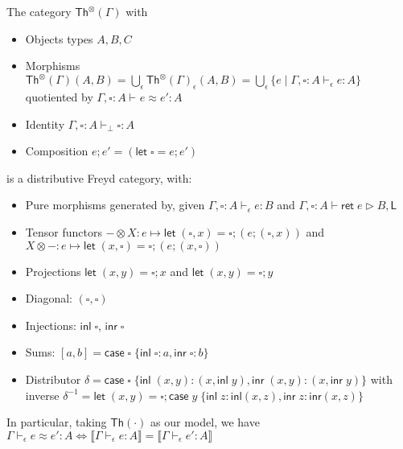 \documentclass[acmsmall,screen,review]{acmart}
\newcommand{\ms}[1]{\ensuremath{\mathsf{#1}}}
\newcommand{\lto}{:}
\newcommand{\linl}[1]{\ms{inl}\;{#1}}
\newcommand{\linr}[1]{\ms{inr}\;{#1}}
\newcommand{\caseexpr}[5]{\ms{case}\;#1\;\{\linl{#2} \lto #3, \linr{#4} \lto #5\}}
\newcommand{\bhyp}[2]{#1 : #2}
\newcommand{\hasty}[4]{#1 \vdash_{#2} #3: {#4}}
\newcommand{\haslb}[3]{#1 \vdash #2 \rhd #3}
\newcommand{\teqv}{\approx}
\newcommand{\tmeq}[5]{#1 \vdash_{#2} #3 \teqv #4 : {#5}}
\newcommand{\dnt}[1]{\llbracket{#1}\rrbracket}
\begin{document}
\begin{theorem}
  The category $\ms{Th}^\otimes(\Gamma)$ with
  \begin{itemize}
    \item Objects types $A, B, C$
    \item Morphisms $\ms{Th}^\otimes(\Gamma)(A, B) 
      = \bigcup_\epsilon\ms{Th}^\otimes(\Gamma)_\epsilon(A, B) 
      = \bigcup_\epsilon\{e \mid \hasty{\Gamma, \bhyp{\square}{A}}{\epsilon}{e}{A}\}$
      quotiented by $\tmeq{\Gamma, \bhyp{\square}{A}}{}{e}{e'}{A}$
    \item Identity $\hasty{\Gamma, \bhyp{\square}{A}}{\bot}{\square}{A}$
    \item Composition $e;e' = (\ms{let}\;\square = e; e')$ 
  \end{itemize} 
  is a distributive Freyd category, with:
  \begin{itemize}
    \item Pure morphisms generated by, given $\hasty{\Gamma, \bhyp{\square}{A}}{\epsilon}{e}{B}$ and
          $\haslb{\Gamma, \bhyp{\square}{A}}{\ms{ret}\;e}{B, \ms{L}}$
    \item Tensor functors 
      $- \otimes X : e \mapsto \ms{let}\;(\square, x) 
        = \square; (e ; (\square, x))$
      and 
      $X \otimes - : e \mapsto \ms{let}\;(x, \square) 
      = \square; (e ; (x, \square))$
    \item Projections $\ms{let}\;(x, y) = \square; x$ and  
      $\ms{let}\;(x, y) = \square; y$
    \item Diagonal: $(\square, \square)$
    \item Injections: $\ms{inl}\;\square$, $\ms{inr}\;\square$
    \item Sums: $
      [a, b] = \caseexpr{\square}{\square}{a}{\square}{b}
    $
    \item Distributor
      $\delta = \caseexpr{\square}{(x, y)}{(x, \ms{inl}\;y)}{(x, y)}{(x, \ms{inr}\;y)}$
      with inverse
      $\delta^{-1} = \ms{let}\;(x, y) = \square; 
        \caseexpr{y}{z}{\ms{inl}(x, z)}{z}{\ms{inr}(x, z)}$
  \end{itemize}
  In particular, taking $\ms{Th}(\cdot)$ as our model, we have 
  $
    \tmeq{\Gamma}{\epsilon}{e}{e'}{A} 
    \iff \dnt{\hasty{\Gamma}{\epsilon}{e}{A}} = \dnt{\hasty{\Gamma}{\epsilon}{e'}{A}}
  $
\end{theorem}
\end{document}
